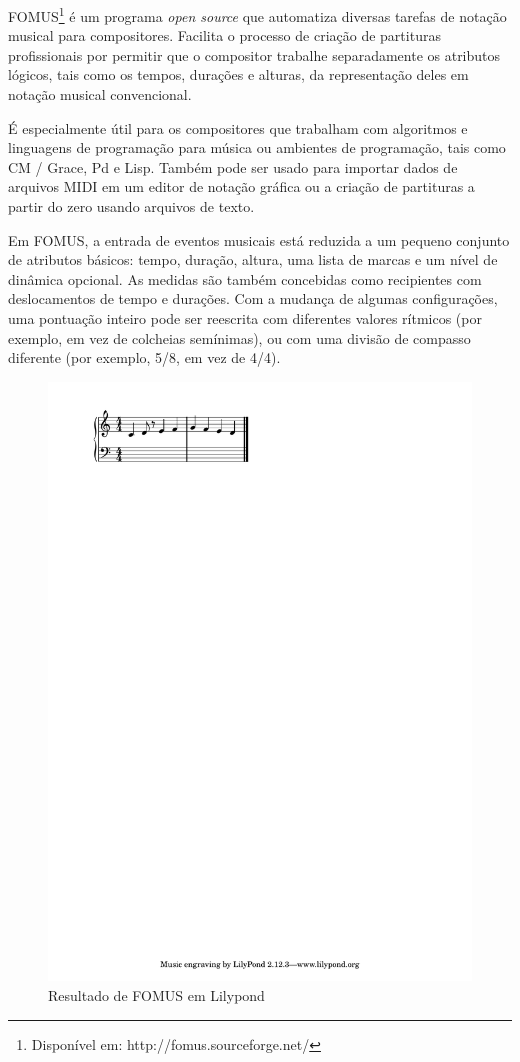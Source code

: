 \documentclass[draft]{ppgmus}
\begin{document}

FOMUS\footnote{Disponível em: http://fomus.sourceforge.net/} é um programa \textit{open source} que automatiza diversas tarefas de notação musical para compositores. 
Facilita o processo de criação de partituras profissionais por permitir que o compositor trabalhe separadamente os atributos 
lógicos, tais como os tempos, durações e alturas, da representação deles em notação musical convencional. 

É especialmente útil para os compositores que trabalham com algoritmos e linguagens de programação para música ou 
ambientes de programação, tais como CM / Grace, Pd e Lisp. Também pode ser usado para importar dados de arquivos MIDI em um editor 
de notação gráfica ou a criação de partituras a partir do zero usando arquivos de texto.

Em FOMUS, a entrada de eventos musicais está reduzida a um pequeno conjunto de atributos básicos: tempo, 
duração, altura, uma lista de marcas e um nível de dinâmica opcional. As medidas são também concebidas como 
recipientes com deslocamentos de tempo e durações. Com a mudança de algumas configurações, uma pontuação inteiro pode 
ser reescrita com diferentes valores rítmicos (por exemplo, em vez de colcheias semínimas), ou com uma divisão de compasso 
diferente (por exemplo, 5/8, em vez de 4/4). 

\begin{figure}
\includegraphics[scale= 1]{fomus}
\caption{Resultado de FOMUS em Lilypond}
\label{fomus}
\end{figure} 
\end{document}
